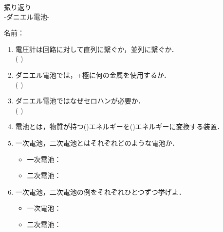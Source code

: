 \documentclass[fontsize=15pt]{jlreq}
\begin{document}
\begin{center}
{\LARGE {振り返り}} \\
-ダニエル電池- %
\end{center}
\vspace{1em}
\begin{flushright}
名前：\underline{\hspace{5cm}}
\end{flushright}

\begin{enumerate}
    \item 電圧計は回路に対して直列に繋ぐか，並列に繋ぐか．\\
    ( \hspace{2cm} )
    \vspace{2em} 

    \item ダニエル電池では，+極に何の金属を使用するか．\\
    ( \hspace{2cm} )
    \vspace{2em} 

    \item ダニエル電池ではなぜセロハンが必要か．\\
    ( \hspace{10cm} )
    \vspace{2em} 

    \item 電池とは，物質が持つ(\hspace{2cm})エネルギーを(\hspace{2cm})エネルギーに変換する装置．
    \vspace{2em} 

    \item 一次電池，二次電池とはそれぞれどのような電池か．
    \begin{itemize}
      \item 一次電池：
      \vspace{2em}
      \item 二次電池：
    \end{itemize}
    \vspace{2em} 

    \item 一次電池，二次電池の例をそれぞれひとつずつ挙げよ．
    \begin{itemize}
      \item 一次電池：
      \vspace{2em}
      \item 二次電池：
    \end{itemize}

\end{enumerate}
\end{document}
